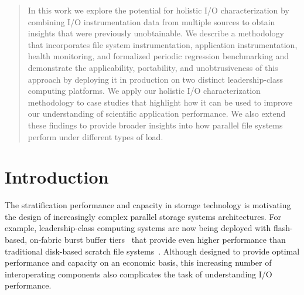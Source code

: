 \documentclass[conference,10pt,compsocconf]{IEEEtran}
\begin{document}
\begin{abstract}
In this work we explore the potential for holistic I/O characterization
by combining I/O instrumentation data from multiple sources to obtain
insights that were previously unobtainable. We describe a methodology that
incorporates file system instrumentation, application instrumentation,
health monitoring, and formalized periodic regression benchmarking and demonstrate
the applicability, portability, and unobtrusiveness of this approach by
deploying it in production on two distinct leadership-class computing
platforms.
%
%
%
We apply our holistic I/O characterization methodology to case studies
that highlight how it can be used to improve our understanding of
scientific application performance.  We also extend these findings to
provide broader insights into how parallel file systems perform under
different types of load.

\end{abstract}

\section{Introduction} \label{sec:introduction}



The stratification performance and capacity in storage technology is 
motivating the design of increasingly complex parallel storage systems architectures.  For
example, leadership-class computing systems are now being deployed with
flash-based, on-fabric burst buffer tiers~\cite{Henseler2016} that provide even higher performance
than traditional disk-based scratch file systems~\cite{Bhimji2016}.  Although designed to provide optimal performance and
capacity on an economic basis, this increasing number of interoperating
components also complicates the task of understanding I/O performance.
\end{document}
